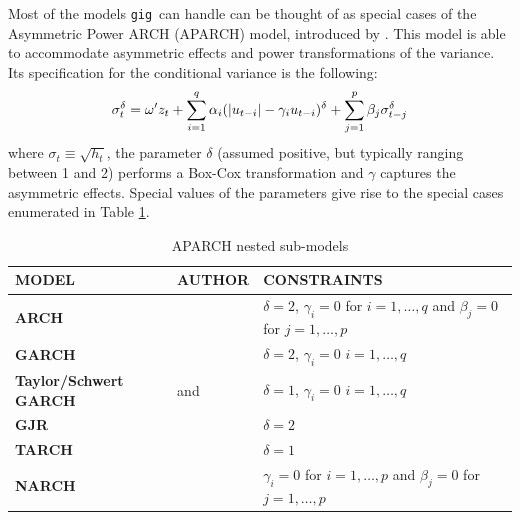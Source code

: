 \documentclass[a4paper,11pt]{article}
\newcommand{\uhat}{\ensuremath u}
\newcommand{\gig}{\texttt{gig}}
\begin{document}
Most of the models \gig\ can handle can be thought of as special
cases of the Asymmetric Power ARCH (APARCH) model, introduced by
\cite{Ding-Engle-Granger}. This model is able to accommodate
asymmetric effects and power transformations of the variance. Its
specification for the conditional variance is the following:
\begin{equation} \label{eq:aparch} \sigma_t^\delta = \omega'z_t +
  \sum_{i=1}^q \alpha_i(|\uhat_{t-i}| - \gamma_i
  \uhat_{t-i})^\delta + \sum_{j=1}^p\beta_j\sigma_{t-j}^\delta
\end{equation}
where $\sigma_t \equiv \sqrt{h_t}$, the parameter $\delta$ (assumed
positive, but typically ranging between 1 and 2) performs a Box-Cox
transformation and $\gamma$ captures the asymmetric effects.  Special
values of the parameters give rise to the special cases enumerated in
Table \ref{tab:APARCH-submodels}.

\begin{table}[hptb]
  \centering
  \begin{tabular}{p{}p{}p{}}
    \hline
    MODEL & AUTHOR & CONSTRAINTS \\
    \hline
    \textbf{ARCH} & \cite{Engle-82} & $\delta=2$, $\gamma_i = 0$ for
 $ i=1,\ldots,q$ and $\beta_j = 0$ for $j=1,\ldots,p$ \\
 \hline
 \textbf{GARCH} & \cite{Bollerslev-86} & $\delta=2$,
  $\gamma_i = 0$ $ i=1,\ldots,q$ \\
  \hline
  \textbf{Taylor/Schwert GARCH} & \cite{Taylor} and \cite{Schwert} & $\delta=1$,
  $\gamma_i = 0$ $ i=1,\ldots,q$\\
  \hline
  \textbf{GJR} & \cite{Glosten-Jagannathan-Runkle} & $\delta=2$ \\
  \hline
  \textbf{TARCH} & \cite{Zakoian} & $\delta=1$\\
  \hline
  \textbf{NARCH} & \cite{Higgins-Bera} & $\gamma_i = 0$ for
  $ i=1,\ldots,p$ and $\beta_j = 0$ for $j=1,\ldots,p$\\
  \hline
  \end{tabular}
  \caption{APARCH nested sub-models}
  \label{tab:APARCH-submodels}
\end{table}
\end{document}
